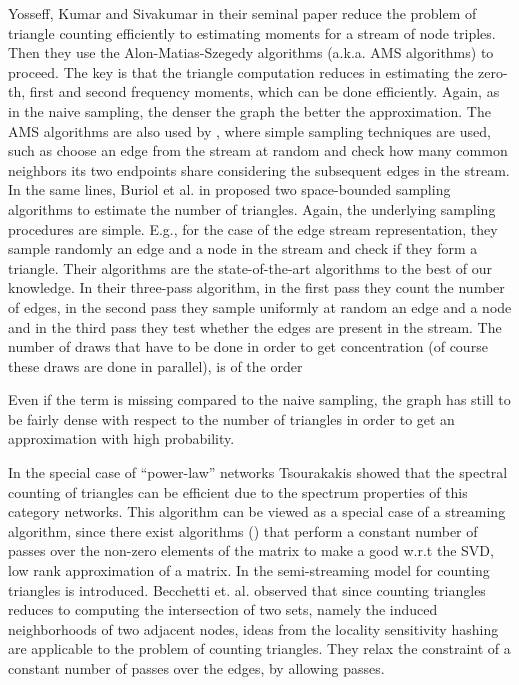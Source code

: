 \documentclass{llncs}
\begin{document}
Yosseff, Kumar and Sivakumar in their seminal paper \cite{yosseff} reduce the problem of triangle counting efficiently to estimating
moments for a stream of node triples. Then they use the Alon-Matias-Szegedy algorithms \cite{amsalgos} (a.k.a. AMS algorithms) to proceed. 
The key is that the triangle computation reduces in estimating the zero-th, first and second frequency moments, which can be done efficiently. 
Again, as in the naive sampling, the denser the graph the better the approximation.
The AMS algorithms are also used by \cite{jowhary}, where simple sampling techniques are used, such
as choose an edge from the stream at random and check how many common neighbors its two endpoints share considering the subsequent edges 
in the stream. 
In the same lines, Buriol et al. in \cite{buriol} proposed two space-bounded sampling algorithms to estimate the number of triangles. 
Again, the underlying sampling procedures are simple. E.g., for the case of the edge stream representation, they sample randomly
an edge and a node in the stream and check if they form a triangle. Their algorithms are the state-of-the-art algorithms to 
the best of our knowledge. In their three-pass algorithm, in the first pass they count the number of edges, in the second pass 
they sample uniformly at random an edge  and a node  and in the third pass they test
whether the edges  are present in the stream. The number of draws that have to be done in order to get 
concentration (of course these draws are done in parallel), is of the order

Even if the term  is missing compared to the naive sampling, the graph has still to be fairly dense with respect
to the number of triangles in order to get an  approximation with high probability. 

In the special case of ``power-law'' networks Tsourakakis \cite{me1} showed that the spectral counting of triangles 
can be efficient due to the spectrum properties of this category networks. This algorithm can be viewed as a special case
of a streaming algorithm, since there exist algorithms (\cite{tamas}) that perform a constant number of passes
over the non-zero elements of the matrix to make a good w.r.t the SVD, low rank approximation of a matrix.
In \cite{gionis:spam} the semi-streaming model for counting triangles is introduced. Becchetti et. al. observed
that since counting triangles reduces to computing the intersection of two sets, namely the induced neighborhoods
of two adjacent nodes, ideas from the locality sensitivity hashing \cite{alan} are applicable to the problem of counting
triangles. They relax the constraint of a constant number of passes over the edges, by allowing  passes. 
 
\end{document}
